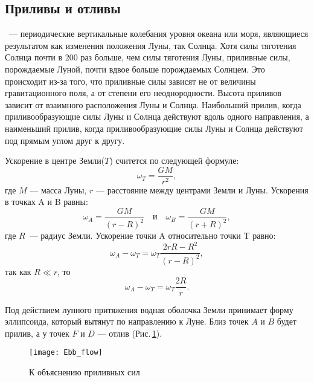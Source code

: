 \subsection{Приливы и отливы}

~--- периодические вертикальные колебания уровня океана или моря, являющиеся результатом как изменения положения Луны, так Солнца. Хотя силы тяготения Солнца почти в 200 раз больше, чем силы тяготения Луны, приливные силы, порождаемые Луной, почти вдвое больше порождаемых Солнцем. Это происходит из-за того, что приливные силы зависят не от величины гравитационного поля, а от степени его неоднородности. Высота приливов зависит от взаимного расположения Луны и Солнца. Наибольший прилив, когда приливообразующие силы Луны и Солнца действуют вдоль одного направления, а наименьший прилив, когда приливообразующие силы Луны и Солнца действуют под прямым углом друг к другу.

Ускорение в центре Земли($T$) считется по следующей формуле: \begin{equation}\omega_T=\frac{GM}{r^2},
\end{equation}
где $M$ --- масса Луны, $r$ --- расстояние между центрами Земли и Луны. Ускорения в точках A и B равны: \begin{equation}
\omega_A = \frac{GM}{(r - R)^2} \quad \text{и} \quad \omega_B = \frac{GM}{(r + R)^2},
\end{equation}
где $R$~--- радиус Земли. Ускорение точки A относительно точки T равно:\begin{equation}
\omega_A - \omega_T = \omega_T \frac{2 r R - R^2}{(r - R)^2},
\end{equation}
так как $R\ll r$, то \begin{equation}
\omega_A - \omega_T = \omega_T \frac{2 R}{r}.
\end{equation}

Под действием лунного притяжения водная оболочка Земли принимает форму 
эллипсоида, который вытянут по направлению к Луне. Близ точек $A$ и $B$ будет 
прилив, а у точек $F$ и $D$ --- отлив (Рис.\,\ref{Ebb_flow}).
\begin{figure}[h!]
\centering
\texttt{[image: Ebb\_flow]}
\caption{К объяснению приливных сил}\label{Ebb_flow}
\end{figure}